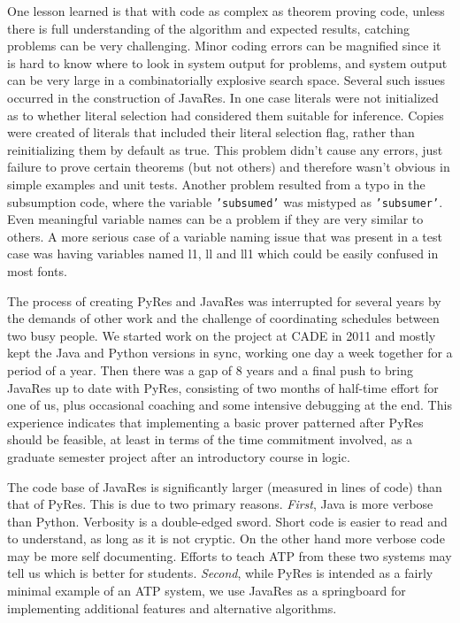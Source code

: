\documentclass{llncs}
\begin{document}
One lesson learned is that with code as complex as theorem proving
code, unless there is full understanding of the algorithm and expected
results, catching problems can be very challenging.  Minor coding
errors can be magnified since it is hard to know where to look in
system output for problems, and system output can be very large in a
combinatorially explosive search space.  Several such issues occurred
in the construction of JavaRes.  In one case literals were not
initialized as to whether literal selection had considered them
suitable for inference.  Copies were created of literals that included
their literal selection flag, rather than reinitializing them by
default as true.  This problem didn't cause any errors, just failure
to prove certain theorems (but not others) and therefore wasn't
obvious in simple examples and unit tests.  Another problem resulted
from a typo in the subsumption code, where the variable
\texttt{'subsumed'} was mistyped as \texttt{'subsumer'}.  Even
meaningful variable names can be a problem if they are very similar to
others.  A more serious case of a variable naming issue that was
present in a test case was having variables named l1, ll and ll1 which
could be easily confused in most fonts.

The process of creating PyRes and JavaRes was interrupted for several
years by the demands of other work and the challenge of coordinating
schedules between two busy people.  We started work on the project at
CADE in 2011 and mostly kept the Java and Python versions in sync,
working one day a week together for a period of a year.  Then there was a gap of 8 years and
a final push to bring JavaRes up to date with PyRes, consisting of two
months of half-time effort for one of us, plus occasional coaching and
some intensive debugging at the end.  This experience indicates that
implementing a basic prover patterned after PyRes should be feasible,
at least in terms of the time commitment involved, as a
graduate semester project after an introductory course in logic.

The code base of JavaRes is significantly larger (measured in lines of
code) than that of PyRes. This is due to two primary reasons. \textit{First}, Java
is more verbose than Python.  Verbosity is a double-edged sword. Short code is easier to
read and to understand, as long as it is not cryptic. On the other
hand more verbose code may be more self documenting. Efforts to teach
ATP from these two systems may tell us which is better for students.
\textit{Second}, while PyRes is intended as a fairly minimal example of an ATP system, we
use JavaRes as a springboard for implementing additional features
and alternative algorithms.
\end{document}
